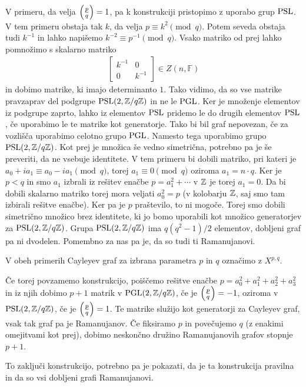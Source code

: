 V primeru, da velja \(\left(\frac{p}{q}\right) = 1\), pa k konstrukciji pristopimo z uporabo grup \(\operatorname{PSL}\). V tem primeru obstaja tak \(k\), da velja \(p\equiv k^2 \pmod q\). Potem seveda obstaja tudi \(k^{-1}\) in lahko napišemo \(k^{-2} \equiv p^{-1}\pmod q\). Vsako matriko od prej lahko pomnožimo s skalarno matriko
\begin{align*}
    \begin{bmatrix}
        k^{-1} & 0 \\
        0 & k^{-1}
    \end{bmatrix}\in Z(n, \mathbb F)
\end{align*}
in dobimo matrike, ki imajo determinanto \(1\). Tako vidimo, da so vse matrike pravzaprav del podgrupe \(\operatorname{PSL}(2, \mathbb Z/q\mathbb Z)\) in ne le \(\operatorname{PGL}\). Ker je množenje elementov iz podgrupe zaprto, lahko iz elementov \(\operatorname{PSL}\) pridemo le do drugih elementov \(\operatorname{PSL}\), če uporabimo le te matrike kot generatorje. Tako bi bil graf nepovezan, če za vozlišča uporabimo celotno grupo \(\operatorname{PGL}\). Namesto tega uporabimo grupo \(\operatorname{PSL}(2, \mathbb Z/q\mathbb Z)\). Kot prej je množica še vedno simetrična, potrebno pa je še preveriti, da ne vsebuje identitete. V tem primeru bi dobili matriko, pri kateri je \(a_0 +ia_1 \equiv a_0 - ia_1 \pmod q\), torej \(a_1 \equiv 0 \pmod q\) oziroma \(a_1 = n\cdot q\). Ker je \(p<q\) in smo \(a_1\) izbrali iz rešitev enačbe \(p=a_1^2 + \cdots\) v \(\mathbb Z\) je torej \(a_1=0\). Da bi dobili skalarno matriko torej mora veljati \(a_0^2 = p\) (v kolobarju \(\mathbb Z\), saj smo tam izbirali rešitve enačbe). Ker pa je \(p\) praštevilo, to ni mogoče. Torej smo dobili simetrično množico brez identitete, ki jo bomo uporabili kot množico generatorjev za \(\operatorname{PSL}(2, \mathbb Z/q\mathbb Z)\). Grupa \(\operatorname{PSL}(2, \mathbb Z/q\mathbb Z)\) ima \(q(q^2-1)/2\) elementov, dobljeni graf pa ni dvodelen. Pomembno za nas pa je, da so tudi ti Ramanujanovi. 

V obeh primerih Cayleyev graf za izbrana parametra \(p\) in \(q\) označimo z \(X^{p,q}\).

Če torej povzamemo konstrukcijo, poiščemo rešitve enačbe \(p = a_0^2 + a_1^2 + a_2^2 + a_3^2\) in iz njih dobimo \(p+1\) matrik v \(\operatorname{PGL}(2, \mathbb Z/q\mathbb Z)\), če je \(\left(\frac{p}{q}\right)=-1\), oziroma v \(\operatorname{PSL}(2, \mathbb Z/q\mathbb Z)\), če je \(\left(\frac{p}{q}\right)=1\). Te matrike služijo kot generatorji za Cayleyev graf, vsak tak graf pa je Ramanujanov. Če fiksiramo \(p\) in povečujemo \(q\) (z enakimi omejitvami kot prej), dobimo neskončno družino Ramanujanovih grafov stopnje \(p+1\).

To zaključi konstrukcijo, potrebno pa je pokazati, da je ta konstrukcija pravilna in da so vsi dobljeni grafi Ramanujanovi.

